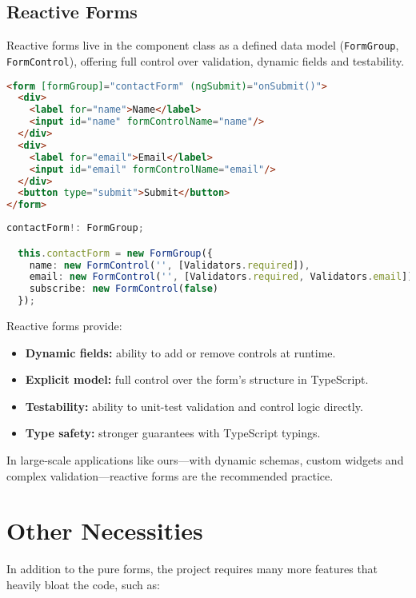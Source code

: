 \subsection{Reactive Forms}

Reactive forms live in the component class as a defined data model (\texttt{FormGroup}, \texttt{FormControl}), offering
full control over validation, dynamic fields and testability.

\begin{lstlisting}[language=HTML,caption={Reactive Form HTML}, label={lst:reactiveHTML}]
<form [formGroup]="contactForm" (ngSubmit)="onSubmit()">
  <div>
    <label for="name">Name</label>
    <input id="name" formControlName="name"/>
  </div>
  <div>
    <label for="email">Email</label>
    <input id="email" formControlName="email"/>
  </div>
  <button type="submit">Submit</button>
</form>
\end{lstlisting}

\begin{lstlisting}[language=TypeScript,caption={Reactive Form TS}, label={lst:reactiveTS}]
  contactForm!: FormGroup;

  this.contactForm = new FormGroup({
    name: new FormControl('', [Validators.required]),
    email: new FormControl('', [Validators.required, Validators.email]),
    subscribe: new FormControl(false)
  });
\end{lstlisting}

Reactive forms provide:
\begin{itemize}
  \item \textbf{Dynamic fields:} ability to add or remove controls at runtime.
  \item \textbf{Explicit model:} full control over the form’s structure in TypeScript.
  \item \textbf{Testability:} ability to unit-test validation and control logic directly.
  \item \textbf{Type safety:} stronger guarantees with TypeScript typings.
\end{itemize}

In large‐scale applications like ours—with dynamic schemas, custom widgets and complex validation—reactive forms are
the recommended practice.

\section{Other Necessities}
In addition to the pure forms, the project requires many more features that heavily bloat the code, such as:

